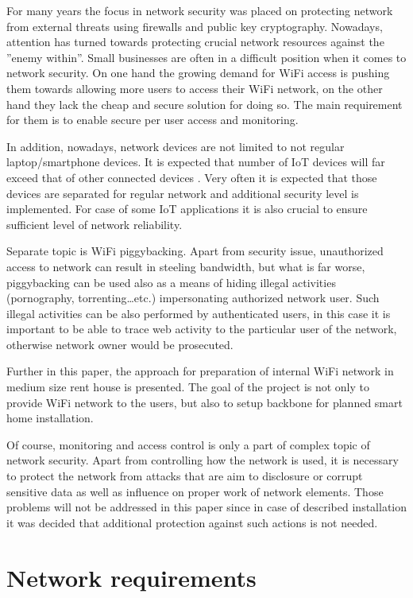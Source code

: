 \documentclass{llncs}
\begin{document}
For many years the focus in network security was placed on protecting
network from external threats using firewalls and public key cryptography.
Nowadays, attention has turned towards protecting crucial network resources
against the ''enemy within''. Small businesses are often in a difficult position when
it comes to network security. On one hand the growing demand for WiFi access is pushing them
towards allowing more users to access their WiFi network, on the other hand they
lack the cheap and secure solution for doing so. The main requirement for them is
to enable secure per user access and monitoring. 

In addition, nowadays, network devices are not limited to not
regular laptop/smartphone devices. It is expected that number of IoT devices
will far exceed that of other connected devices \cite{IoTwillGrow}. Very often
it is expected that those devices are separated for regular network and additional security
level is implemented. For case of some IoT applications it is also crucial to ensure sufficient 
level of network reliability.

Separate topic is WiFi piggybacking. Apart from security issue,
unauthorized access to network can result in steeling bandwidth, but what is far
worse, piggybacking can be used also as a means of hiding illegal activities
(pornography, torrenting\ldots etc.) impersonating authorized network user. Such
illegal activities can be also performed by authenticated users, in this case it is
important to be able to trace web activity to the particular user of the
network, otherwise network owner would be prosecuted. 

Further in this paper, the approach for preparation of internal WiFi network in
medium size rent house is presented. The goal of the project is not only to
provide WiFi network to the users, but also to setup backbone for planned
smart home installation.

Of course, monitoring and access control is only a part of complex topic of
network security. Apart from controlling how the network is used, it is
necessary to protect the network from attacks that are aim to disclosure or corrupt
sensitive data as well as influence on proper work of network elements.
Those problems will not be addressed in this paper since in case of described
installation it was decided that additional protection against such actions is not
needed.


\section{Network requirements}
\end{document}
